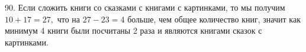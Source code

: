 90. Если сложить книги со сказками с книгами с картинками, то мы получим $10+17=27,$ что на $27-23=4$ больше, чем общее количество книг, значит как минимум 4 книги были посчитаны 2 раза и являются книгами сказок с картинками.\\
